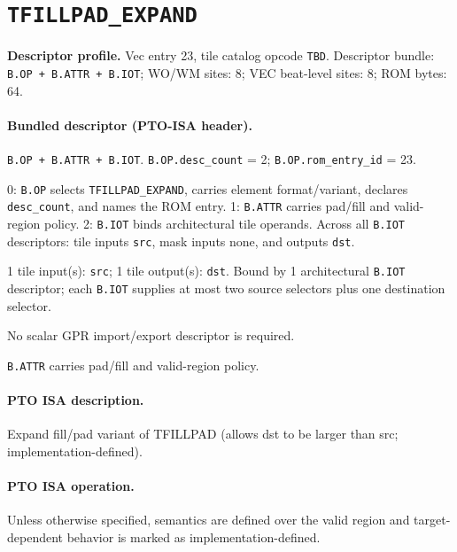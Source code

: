 \section{\texttt{TFILLPAD\_EXPAND}}
\noindent\textbf{Descriptor profile.} Vec entry 23, tile catalog opcode \texttt{TBD}. Descriptor bundle: \texttt{B.OP + B.ATTR + B.IOT}; WO/WM sites: 8; VEC beat-level sites: 8; ROM bytes: 64.\par\smallskip
{}
\paragraph{Bundled descriptor (PTO-ISA header).}
\begin{description}[leftmargin=0.18\linewidth,style=nextline]
\item[Bundle] \texttt{B.OP + B.ATTR + B.IOT}. \texttt{B.OP.desc\_count} = 2; \texttt{B.OP.rom\_entry\_id} = 23.
\item[Assembly] 0: \texttt{B.OP} selects \texttt{TFILLPAD\_EXPAND}, carries element format/variant, declares \texttt{desc\_count}, and names the ROM entry. 1: \texttt{B.ATTR} carries pad/fill and valid-region policy. 2: \texttt{B.IOT} binds architectural tile operands. Across all \texttt{B.IOT} descriptors: tile inputs \texttt{src}, mask inputs none, and outputs \texttt{dst}.
\item[Tile operands] 1 tile input(s): \texttt{src}; 1 tile output(s): \texttt{dst}. Bound by 1 architectural \texttt{B.IOT} descriptor; each \texttt{B.IOT} supplies at most two source selectors plus one destination selector.
\item[Scalar GPR operands] No scalar GPR import/export descriptor is required.
\item[Metadata operands] \texttt{B.ATTR} carries pad/fill and valid-region policy.
\end{description}
\par\smallskip
{\small
\paragraph{PTO ISA description.}
Expand fill/pad variant of TFILLPAD (allows dst to be larger than src; implementation-defined).
\paragraph{PTO ISA operation.}
Unless otherwise specified, semantics are defined over the valid region and target-dependent behavior is marked as implementation-defined.
}\par\smallskip
